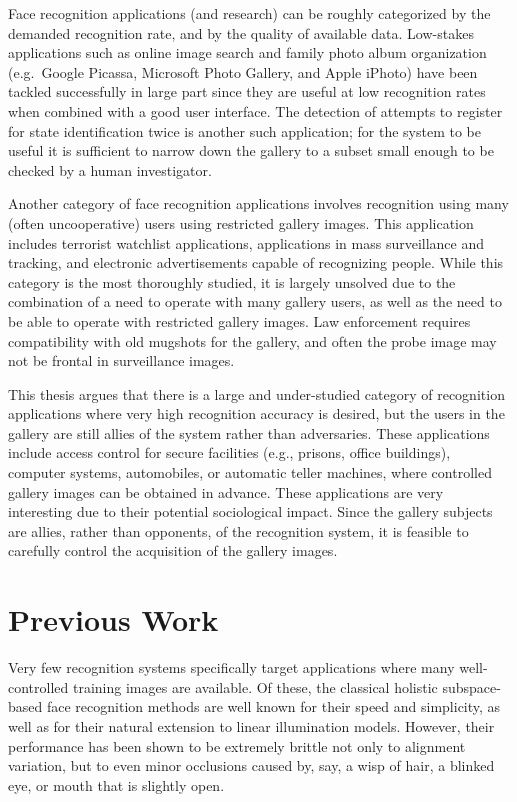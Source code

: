 Face recognition applications (and research) can be roughly categorized by the
demanded recognition rate, and by the quality of available data.  Low-stakes
applications such as online image search and family photo album organization
(e.g.\ Google Picassa, Microsoft Photo Gallery, and Apple iPhoto) have been
tackled successfully in large part since they are useful at low recognition
rates when combined with a good user interface.  The detection of attempts to register
for state identification twice is
another such application; for the system to be useful it is sufficient to narrow
down the gallery to a subset small enough to be checked by a human
investigator.

Another category of face recognition applications involves recognition using
many (often uncooperative) users using restricted gallery images.  This
application includes terrorist watchlist applications, applications in mass
surveillance and tracking, and electronic advertisements capable of recognizing
people.  While this category is the most thoroughly studied, it is largely
unsolved due to the combination of a need to operate with many gallery users,
as well as the need to be able to operate with restricted gallery images.  
Law enforcement requires compatibility with old mugshots for the gallery,
and often the probe image may not be frontal in surveillance images.

This thesis argues that there is a large and under-studied category of
recognition applications where very high recognition accuracy is desired, but
the users in the gallery are still allies of the system rather than
adversaries.  These applications include access control for secure facilities
(e.g., prisons, office buildings), computer systems, automobiles, or automatic
teller machines, where controlled gallery images can be obtained in advance.
These applications are very interesting due to their potential sociological
impact.  Since the gallery subjects are allies, rather than opponents, of the
recognition system, it is feasible to carefully control the acquisition of the
gallery images. 



\section{Previous Work} Very few recognition systems specifically target
applications where many well- controlled training images are available.  Of
these, the classical holistic subspace-based face recognition methods
\cite{Turk1991-CVPR,Belhumeur1997-PAMI} are well known for their speed and
simplicity, as well as for their natural extension to linear illumination
models.  However, their performance has been shown to be extremely brittle not
only to alignment variation, but to even minor occlusions caused by, say, a
wisp of hair, a blinked eye, or mouth that is slightly open. 

